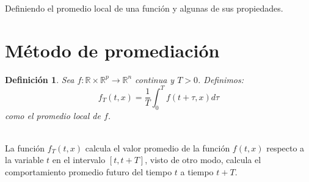 \documentclass[12pt, a4paper]{report}
\newtheorem{definition}{Definición}
\begin{document}
Definiendo el promedio local de una función y algunas de sus propiedades.

\section{Método de promediación}

\begin{definition}
	Sea $f:\mathbb{R}\times\mathbb{R}^p\to\mathbb{R}^n$ continua y $T>0$.
	Definimos:
	$$
		f_T(t,x)=\frac{1}{T}\int_{0}^{T}f(t+\tau,x)d\tau
	$$
	como el promedio local de $f$.
\end{definition}
\\
La función $f_T(t,x)$ calcula el valor promedio de la función $f(t,x)$ 
respecto a la variable $t$ en el intervalo $[t,t+T]$, visto de otro 
modo, calcula el comportamiento promedio futuro del tiempo $t$ a tiempo $t+T$.
\end{document}
